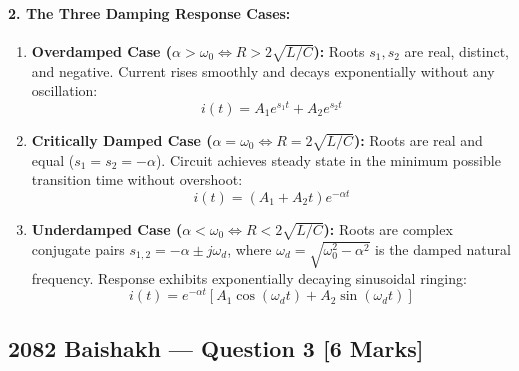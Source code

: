 \documentclass[11pt,a4paper,oneside]{article}
\begin{document}
\paragraph{2. The Three Damping Response Cases:}
\begin{enumerate}[leftmargin=1.5em]
  \item \textbf{Overdamped Case ($\alpha > \omega_0 \iff R > 2\sqrt{L/C}$):}
    Roots $s_1, s_2$ are real, distinct, and negative. Current rises smoothly and decays exponentially without any oscillation:
    \begin{equation}
      i(t) = A_1 e^{s_1 t} + A_2 e^{s_2 t}
    \end{equation}
  \item \textbf{Critically Damped Case ($\alpha = \omega_0 \iff R = 2\sqrt{L/C}$):}
    Roots are real and equal ($s_1 = s_2 = -\alpha$). Circuit achieves steady state in the minimum possible transition time without overshoot:
    \begin{equation}
      i(t) = (A_1 + A_2 t) e^{-\alpha t}
    \end{equation}
  \item \textbf{Underdamped Case ($\alpha < \omega_0 \iff R < 2\sqrt{L/C}$):}
    Roots are complex conjugate pairs $s_{1,2} = -\alpha \pm j\omega_d$, where $\omega_d = \sqrt{\omega_0^2 - \alpha^2}$ is the damped natural frequency. Response exhibits exponentially decaying sinusoidal ringing:
    \begin{equation}
      i(t) = e^{-\alpha t} \left[A_1 \cos(\omega_d t) + A_2 \sin(\omega_d t)\right]
    \end{equation}
\end{enumerate}

\newpage

\subsection{2082 Baishakh --- Question 3 [6 Marks]}
\end{document}
